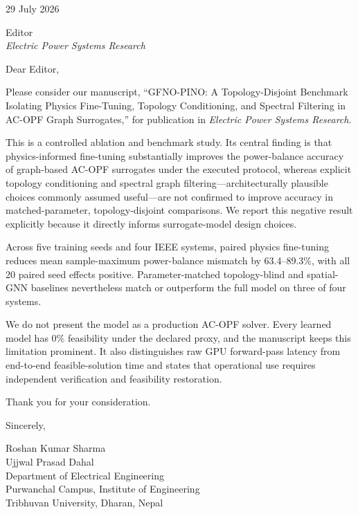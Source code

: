 \documentclass[10pt]{article}
\begin{document}
\hfill 29 July 2026

Editor\\
\emph{Electric Power Systems Research}

Dear Editor,

Please consider our manuscript, ``GFNO-PINO: A Topology-Disjoint Benchmark
Isolating Physics Fine-Tuning, Topology Conditioning, and Spectral Filtering
in AC-OPF Graph Surrogates,'' for publication in \emph{Electric Power Systems
Research}.

This is a controlled ablation and benchmark study. Its central finding is that
physics-informed fine-tuning substantially improves the power-balance accuracy
of graph-based AC-OPF surrogates under the executed protocol, whereas explicit
topology conditioning and spectral graph filtering---architecturally plausible
choices commonly assumed useful---are not confirmed to improve accuracy in
matched-parameter, topology-disjoint comparisons. We report this negative
result explicitly because it directly informs surrogate-model design choices.

Across five training seeds and four IEEE systems, paired physics fine-tuning
reduces mean sample-maximum power-balance mismatch by 63.4--89.3\%, with all
20 paired seed effects positive. Parameter-matched topology-blind and
spatial-GNN baselines nevertheless match or outperform the full model on three
of four systems.

We do not present the model as a production AC-OPF solver. Every learned model
has 0\% feasibility under the declared proxy, and the manuscript keeps this
limitation prominent. It also distinguishes raw GPU forward-pass latency from
end-to-end feasible-solution time and states that operational use requires
independent verification and feasibility restoration.

Thank you for your consideration.

Sincerely,

\vspace{0.5em}
Roshan Kumar Sharma\\
Ujjwal Prasad Dahal\\
Department of Electrical Engineering\\
Purwanchal Campus, Institute of Engineering\\
Tribhuvan University, Dharan, Nepal
\end{document}
